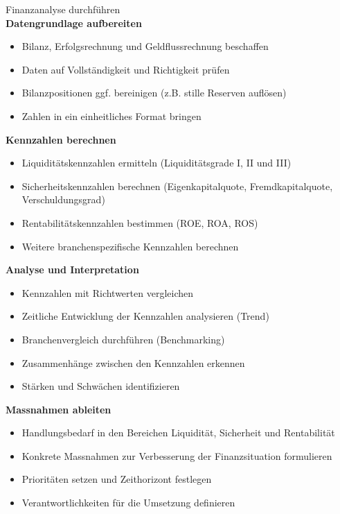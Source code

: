 \begin{KR}{Finanzanalyse durchführen}\\
\textbf{Datengrundlage aufbereiten}
\begin{itemize}
    \item Bilanz, Erfolgsrechnung und Geldflussrechnung beschaffen
    \item Daten auf Vollständigkeit und Richtigkeit prüfen
    \item Bilanzpositionen ggf. bereinigen (z.B. stille Reserven auflösen)
    \item Zahlen in ein einheitliches Format bringen
\end{itemize}

\textbf{Kennzahlen berechnen}
\begin{itemize}
    \item Liquiditätskennzahlen ermitteln (Liquiditätsgrade I, II und III)
    \item Sicherheitskennzahlen berechnen (Eigenkapitalquote, Fremdkapitalquote, Verschuldungsgrad)
    \item Rentabilitätskennzahlen bestimmen (ROE, ROA, ROS)
    \item Weitere branchenspezifische Kennzahlen berechnen
\end{itemize}

\textbf{Analyse und Interpretation}
\begin{itemize}
    \item Kennzahlen mit Richtwerten vergleichen
    \item Zeitliche Entwicklung der Kennzahlen analysieren (Trend)
    \item Branchenvergleich durchführen (Benchmarking)
    \item Zusammenhänge zwischen den Kennzahlen erkennen
    \item Stärken und Schwächen identifizieren
\end{itemize}

\textbf{Massnahmen ableiten}
\begin{itemize}
    \item Handlungsbedarf in den Bereichen Liquidität, Sicherheit und Rentabilität
    \item Konkrete Massnahmen zur Verbesserung der Finanzsituation formulieren
    \item Prioritäten setzen und Zeithorizont festlegen
    \item Verantwortlichkeiten für die Umsetzung definieren
\end{itemize}
\end{KR}